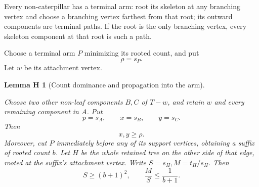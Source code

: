 \documentclass[11pt,letterpaper]{article}
\theoremstyle{plain}
\newtheorem*{hostlemma}{Lemma H}
\begin{document}
Every non-caterpillar has a terminal arm: root its skeleton at any branching vertex and choose a branching vertex farthest from that root; its outward components are terminal paths. If the root is the only branching vertex, every skeleton component at that root is such a path.

Choose a terminal arm \(P\) minimizing its rooted count, and put \[
\rho=s_P.
\tag{2.1}\label{eq:main-2-1}
\] Let \(w\) be its attachment vertex.

\begin{hostlemma}[Count dominance and propagation into the arm]\label{lem:host}

Choose two other non-leaf components \(B,C\) of \(T-w\), and retain \(w\) and every remaining component in \(A\). Put \[
p=s_A,\qquad x=s_B,\qquad y=s_C.
\] Then \[
x,y\ge\rho.
\tag{2.2}\label{eq:main-2-2}
\] Moreover, cut \(P\) immediately before any of its support vertices, obtaining a suffix of rooted count \(b\). Let \(H\) be the whole retained tree on the other side of that edge, rooted at the suffix's attachment vertex. Write \(S=s_H,M=t_H/s_H\). Then \[
\boxed{S\ge(b+1)^2,\qquad \frac MS\le\frac1{b+1}.}
\tag{2.3}\label{eq:main-2-3}
\]

\end{hostlemma}
\end{document}
